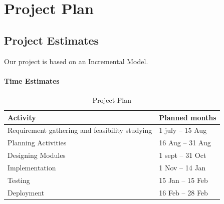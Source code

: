 \documentclass[oneside,a4paper,12pt]{report}
\begin{document}
\chapter{Project Plan}

\section{Project Estimates}
 Our project is based on an Incremental Model. 
 
\subsubsection{Time Estimates}

\begin{table}[!htbp]
\begin{center}
\def\arraystretch{1.5}
\begin{tabularx}{\textwidth}{| X | X |}
\hline
Activity	& Planned months\\
\hline
Requirement gathering and feasibility studying        &1 july – 15 Aug\\
\hline
Planning Activities       &16 Aug – 31 Aug\\
\hline
Designing Modules        &1 sept – 31 Oct\\
\hline
Implementation           &1 Nov – 14 Jan\\
\hline
Testing                  &15 Jan – 15 Feb\\
\hline
Deployment               &16 Feb – 28 Feb\\
\hline



\end{tabularx}
\end{center}
\caption{Project Plan}
\label{tab:usecase}
\end{table}
\newpage
\end{document}
